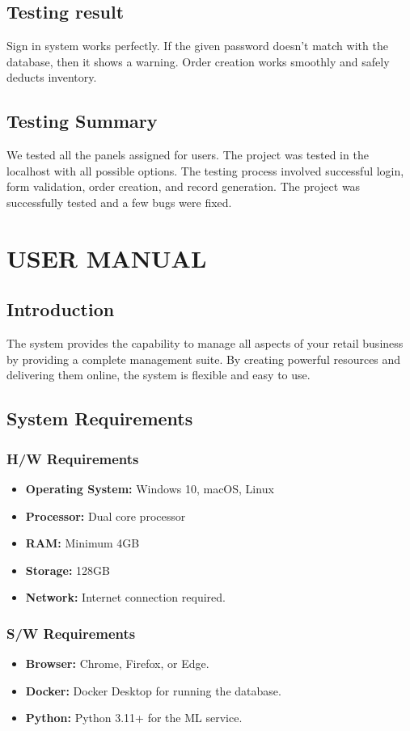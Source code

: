\documentclass[12pt,a4paper]{report}
\begin{document}
\section{Testing result}
Sign in system works perfectly. If the given password doesn't match with the database, then it shows a warning. Order creation works smoothly and safely deducts inventory.

\section{Testing Summary}
We tested all the panels assigned for users. The project was tested in the localhost with all possible options. The testing process involved successful login, form validation, order creation, and record generation. The project was successfully tested and a few bugs were fixed.


\chapter{USER MANUAL}

\section{Introduction}
The system provides the capability to manage all aspects of your retail business by providing a complete management suite. By creating powerful resources and delivering them online, the system is flexible and easy to use.

\section{System Requirements}

\subsection{H/W Requirements}
\begin{itemize}
    \item \textbf{Operating System:} Windows 10, macOS, Linux
    \item \textbf{Processor:} Dual core processor
    \item \textbf{RAM:} Minimum 4GB
    \item \textbf{Storage:} 128GB
    \item \textbf{Network:} Internet connection required.
\end{itemize}

\subsection{S/W Requirements}
\begin{itemize}
    \item \textbf{Browser:} Chrome, Firefox, or Edge.
    \item \textbf{Docker:} Docker Desktop for running the database.
    \item \textbf{Python:} Python 3.11+ for the ML service.
\end{itemize}
\end{document}
